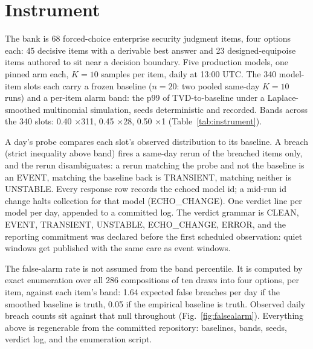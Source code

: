 \documentclass[conference]{IEEEtran}
\begin{document}
\section{Instrument}

The bank is 68 forced-choice enterprise security judgment items,
four options each: 45 decisive items with a derivable best answer
and 23 designed-equipoise items authored to sit near a decision
boundary. Five production models, one pinned arm each, $K=10$
samples per item, daily at 13:00 UTC. The 340 model-item slots each
carry a frozen baseline ($n=20$: two pooled same-day $K=10$ runs)
and a per-item alarm band: the p99 of TVD-to-baseline under a
Laplace-smoothed multinomial simulation, seeds deterministic and
recorded. Bands across the 340 slots: 0.40 $\times$311,
0.45 $\times$28, 0.50 $\times$1
(Table~\ref{tab:instrument}).

A day's probe compares each slot's observed distribution to its
baseline. A breach (strict inequality above band) fires a same-day
rerun of the breached items only, and the rerun disambiguates: a
rerun matching the probe and not the baseline is an EVENT, matching
the baseline back is TRANSIENT, matching neither is UNSTABLE. Every
response row records the echoed model id; a mid-run id change halts
collection for that model (ECHO\_CHANGE). One verdict line per
model per day, appended to a committed log. The verdict grammar is
CLEAN, EVENT, TRANSIENT, UNSTABLE, ECHO\_CHANGE, ERROR, and the
reporting commitment was declared before the first scheduled
observation: quiet windows get published with the same care as
event windows.

The false-alarm rate is not assumed from the band percentile. It is
computed by exact enumeration over all 286 compositions of ten
draws into four options, per item, against each item's band: 1.64
expected false breaches per day if the smoothed baseline is truth,
0.05 if the empirical baseline is truth. Observed daily breach
counts sit against that null throughout
(Fig.~\ref{fig:falsealarm}). Everything above is regenerable from
the committed repository: baselines, bands, seeds, verdict log, and
the enumeration script.
\end{document}
